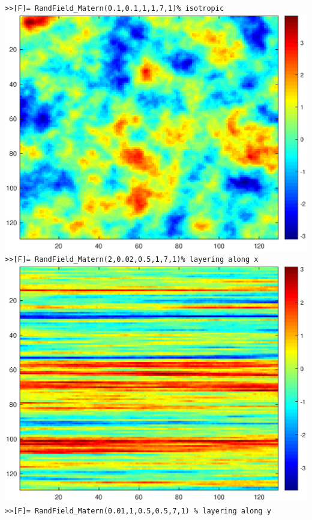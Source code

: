 \documentclass{extarticle}
\begin{document}
\vspace{1cm}
\texttt{>>[F]= RandField\_Matern(0.1,0.1,1,1,7,1)\% isotropic}\\
\centering
\includegraphics[scale=0.4]{f1.eps}\\
\texttt{>>[F]= RandField\_Matern(2,0.02,0.5,1,7,1)\% layering along x}\\
\centering
\includegraphics[scale=0.4]{f2.eps}\\
\texttt{>>[F]= RandField\_Matern(0.01,1,0.5,0.5,7,1) \% layering along y}\\
\centering
\end{document}
